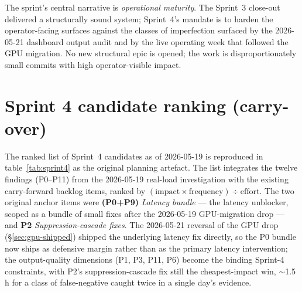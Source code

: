\documentclass[11pt,a4paper,oneside]{report}
\begin{document}
The sprint's central narrative is \emph{operational maturity}.  The
Sprint~3 close-out delivered a structurally sound system; Sprint~4's
mandate is to harden the operator-facing surfaces against the
classes of imperfection surfaced by the 2026-05-21 dashboard
output audit and by the live operating week that followed the GPU
migration.  No new structural epic is opened; the work is
disproportionately small commits with high operator-visible
impact.

\section{Sprint 4 candidate ranking (carry-over)}

The ranked list of Sprint~4 candidates as of 2026-05-19 is reproduced
in table~\ref{tab:sprint4} as the original planning artefact.  The
list integrates the twelve findings (P0--P11) from the 2026-05-19
real-load investigation with the existing carry-forward backlog
items, ranked by
$(\text{impact}\times\text{frequency})\div\text{effort}$.  The two
original anchor items were \textbf{(P0+P9)} \emph{Latency bundle}
--- the latency unblocker, scoped as a bundle of small fixes
after the 2026-05-19 GPU-migration drop --- and \textbf{P2}
\emph{Suppression-cascade fixes}.  The 2026-05-21 reversal of the
GPU drop (\S\ref{sec:gpu-shipped}) shipped the underlying latency
fix directly, so the P0 bundle now ships as defensive margin
rather than as the primary latency intervention; the
output-quality dimensions (P1, P3, P11, P6) become the binding
Sprint-4 constraints, with P2's suppression-cascade fix still the
cheapest-impact win, $\sim$1.5\,h for a class of false-negative
caught twice in a single day's evidence.
\end{document}
